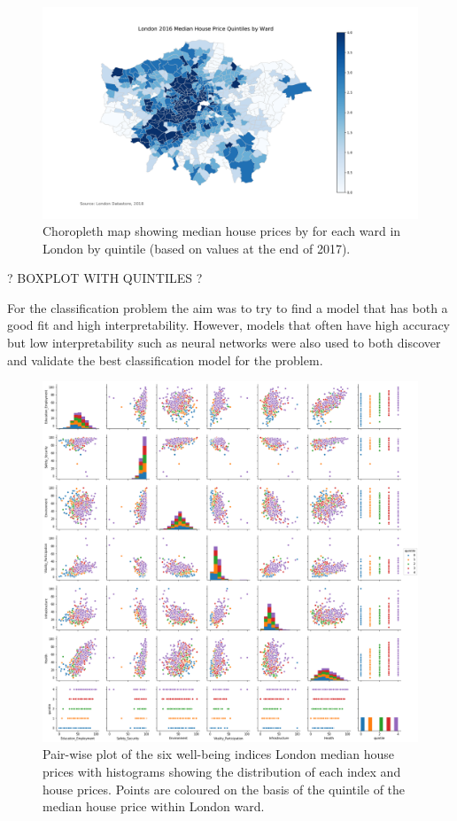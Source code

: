 \begin{figure}
\centering
\includegraphics[scale=0.4]{figures/HPQuintile}
\decoRule
\caption{Choropleth map showing median house prices by for each ward in London by quintile (based on values at the end of 2017).}
\end{figure}

? BOXPLOT WITH QUINTILES ?

For the classification problem the aim was to try to find a model that has both a good fit and high interpretability. However, models that often have high accuracy but low interpretability such as neural networks were also used to both discover and validate the best classification model for the problem.

\begin{figure}
\centering
\includegraphics[scale=0.3]{figures/pairplot_quintile}
\decoRule
\caption{Pair-wise plot of the six well-being indices London median house prices with histograms showing the distribution of each index and house prices. Points are coloured on the basis of the quintile of the median house price within London ward.}
\end{figure}

